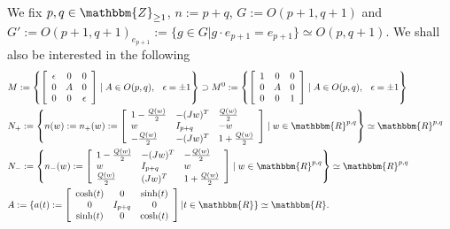 \documentclass{article}
\newcommand{\assign}{:=}
\theoremstyle{remark}
\begin{document}
We fix $p, q \in \mathbbm{Z}_{\geq 1}$, $n \assign p + q$, $G \assign O (p +
1, q + 1)$ and $G' \assign O (p + 1, q + 1)_{e_{p + 1}} \assign \{g \in G|g
\cdot e_{p + 1} = e_{p + 1} \} \simeq O (p, q + 1)$. We shall also be
interested in the following
\begin{eqnarray}
  & M \assign \left\{ \left[ \begin{array}{ccc}
    \epsilon & 0 & 0\\
    0 & A & 0\\
    0 & 0 & \epsilon
  \end{array} \right] \mid A \in O (p, q), \hspace{0.75em} \epsilon = \pm
  1 \right\} \supset M^0 \assign \left\{ \left[ \begin{array}{ccc}
    1 & 0 & 0\\
    0 & A & 0\\
    0 & 0 & 1
  \end{array} \right] \mid A \in O (p, q), \hspace{0.75em} \epsilon = \pm
  1 \right\} &  \nonumber\\
  & N_+ \assign \left\{ n (w) \assign n_+ (w) \assign \left[
  \begin{array}{lll}
    1 - \frac{Q (w)}{2} & - (J w)^T & \frac{Q (w)}{2}\\
    w & I_{p + q} & - w\\
    - \frac{Q (w)}{2} & - (J w)^T & 1 + \frac{Q (w)}{2}
  \end{array} \right] \mid w \in \mathbbm{R}^{p, q} \right\} \simeq
  \mathbbm{R}^{p, q}  \label{def-n-nots:eq-N+} & \\
  & N_- \assign \left\{ n_- (w) \assign \left[ \begin{array}{lll}
    1 - \frac{Q (w)}{2} & - (J w)^T & - \frac{Q (w)}{2}\\
    w & I_{p + q} & w\\
    \frac{Q (w)}{2} & (J w)^T & 1 + \frac{Q (w)}{2}
  \end{array} \right] \mid w \in \mathbbm{R}^{p, q} \right\} \simeq
  \mathbbm{R}^{p, q}  \label{def-n-nots:eq:N-} & \\
  & A \assign \{a (t) \assign \left[ \begin{array}{ccc}
    \cosh (t) & 0 & \sinh (t)\\
    0 & I_{p + q} & 0\\
    \sinh (t) & 0 & \cosh (t)
  \end{array} \right] |t \in \mathbbm{R}\} \simeq \mathbbm{R}. 
  \label{def-n-nots:eq-A} & 
\end{eqnarray}
\end{document}

